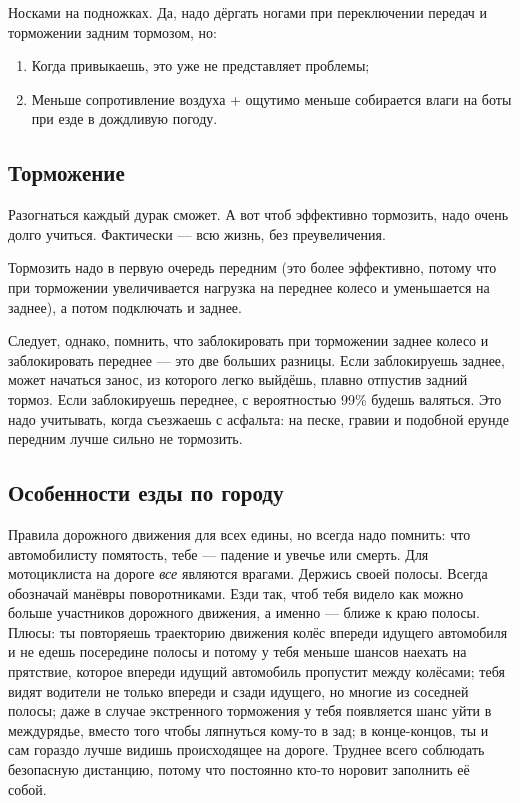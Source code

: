 \documentclass[12pt,a4paper]{article}
\begin{document}
Носками на подножках. Да, надо дёргать ногами при переключении
передач и торможении задним тормозом, но:

\begin{enumerate}
\item Когда привыкаешь, это уже не представляет проблемы;
\item Меньше сопротивление воздуха + ощутимо меньше собирается влаги
на боты при езде в дождливую погоду.
\end{enumerate}

\subsection{Торможение}

Разогнаться каждый дурак сможет. А вот чтоб эффективно тормозить,
надо очень долго учиться. Фактически --- всю жизнь, без преувеличения.

Тормозить надо в первую очередь передним (это более эффективно, потому что при
торможении увеличивается нагрузка на переднее колесо и уменьшается на заднее),
а потом подключать и заднее.

Следует, однако, помнить, что заблокировать при торможении заднее колесо и
заблокировать переднее --- это две больших разницы. Если заблокируешь заднее,
может начаться занос, из которого легко выйдёшь, плавно отпустив задний тормоз.
Если заблокируешь переднее, с вероятностью 99\% будешь валяться. Это
надо учитывать, когда съезжаешь с асфальта: на песке, гравии и подобной
ерунде передним лучше сильно не тормозить.

\subsection{Особенности езды по городу}

Правила дорожного движения для всех едины, но всегда надо помнить:
что автомобилисту помятость, тебе --- падение и увечье или смерть.
Для мотоциклиста на дороге \emph{все} являются врагами.
Держись своей полосы. Всегда обозначай манёвры поворотниками.
Езди так, чтоб тебя видело как можно больше участников дорожного
движения, а именно --- ближе к краю полосы. Плюсы: ты повторяешь
траекторию движения колёс впереди идущего автомобиля и не едешь
посередине полосы и потому у тебя меньше шансов наехать на прятствие,
которое впереди идущий автомобиль пропустит между колёсами; тебя
видят водители не только впереди и сзади идущего, но многие из
соседней полосы; даже в случае экстренного торможения у тебя
появляется шанс уйти в междурядье, вместо того чтобы ляпнуться
кому-то в зад; в конце-концов, ты и сам гораздо лучше видишь
происходящее на дороге.
Труднее всего соблюдать безопасную дистанцию, потому что постоянно
кто-то норовит заполнить её собой.
\end{document}
